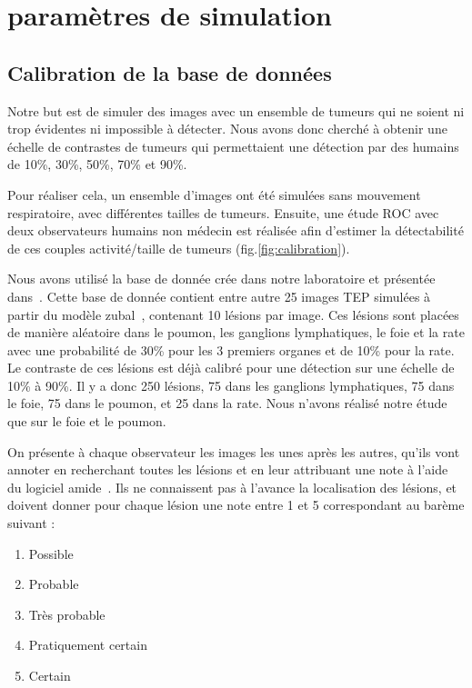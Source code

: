 	\section{paramètres de simulation}

\subsection{Calibration de la base de données}

Notre but est de simuler des images avec un ensemble de tumeurs qui ne soient ni trop évidentes ni impossible à détecter. Nous avons donc cherché à obtenir une échelle de contrastes de tumeurs qui permettaient une détection par des humains de 10\%, 30\%, 50\%, 70\% et 90\%.

Pour réaliser cela, un ensemble d'images ont été simulées sans mouvement respiratoire, avec différentes tailles de tumeurs. Ensuite, une étude ROC avec deux observateurs humains non médecin est réalisée afin d'estimer la détectabilité de ces couples activité/taille de tumeurs (fig.\ref{fig:calibration}). 

Nous avons utilisé la base de donnée crée dans notre laboratoire et présentée dans~\cite{tomei2010oncopet_db}. Cette base de donnée contient entre autre 25 images TEP simulées à partir du modèle zubal~\cite{zubal1994computerized}, contenant 10 lésions par image. Ces lésions sont placées de manière aléatoire dans le poumon, les ganglions lymphatiques, le foie et la rate avec une probabilité de 30\% pour les 3 premiers organes et de 10\% pour la rate. Le contraste de ces lésions est déjà calibré pour une détection sur une échelle de 10\% à 90\%. Il y a donc 250 lésions, 75 dans les ganglions lymphatiques, 75 dans le foie, 75 dans le poumon, et 25 dans la rate. Nous n'avons réalisé notre étude que sur le foie et le poumon.

On présente à chaque observateur les images les unes après les autres, qu'ils vont annoter en recherchant toutes les lésions et en leur attribuant une note à l'aide du logiciel amide~\cite{loening2003amide}. Ils ne connaissent pas à l'avance la localisation des lésions, et doivent donner pour chaque lésion une note entre 1 et 5 correspondant au barème suivant :

\begin{enumerate}
\item Possible
\item Probable
\item Très probable
\item Pratiquement  certain
\item Certain
\end{enumerate}

